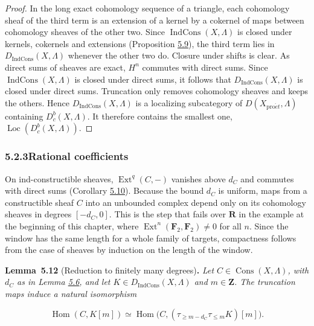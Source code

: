 \documentclass[11pt]{article}
\newenvironment{bpstatement}[2]{\par\addvspace{0.6\baselineskip}\noindent\textbf{#1}#2\textbf{.}\enspace\ignorespaces}
  {\par\addvspace{0.4\baselineskip}}
\newenvironment{bpstatementit}[2]{\begin{bpstatement}{#1}{#2}\itshape\ignorespaces}{\end{bpstatement}}
\providecommand{\Cons}{}\renewcommand{\Cons}{\operatorname{Cons}}
\providecommand{\Dbc}{}\renewcommand{\Dbc}{D^b_c}
\providecommand{\Dic}{}\renewcommand{\Dic}{D_{\IndCons}}
\providecommand{\Ext}{}\renewcommand{\Ext}{\operatorname{Ext}}
\providecommand{\Hom}{}\renewcommand{\Hom}{\operatorname{Hom}}
\providecommand{\IndCons}{}\renewcommand{\IndCons}{\operatorname{IndCons}}
\providecommand{\Loc}{}\renewcommand{\Loc}{\operatorname{Loc}}
\begin{document}
\begin{proof}[{Proof}]\label{bp440}%
In the long exact cohomology sequence of a triangle, each cohomology sheaf of the third term is an extension of a kernel by a cokernel of maps between cohomology sheaves of the other two. Since \(\IndCons(X,\Lambda)\) is closed under kernels, cokernels and extensions (Proposition \hyperref[bp433]{5.9}), the third term lies in \(\Dic(X,\Lambda)\) whenever the other two do. Closure under shifts is clear. As direct sums of sheaves are exact, \(H^n\) commutes with direct sums. Since \(\IndCons(X,\Lambda)\) is closed under direct sums, it follows that \(\Dic(X,\Lambda)\) is closed under direct sums. Truncation only removes cohomology sheaves and keeps the others. Hence \(\Dic(X,\Lambda)\) is a localizing subcategory of \(D(X_{\mathrm{pro}\acute{e}t},\Lambda)\) containing \(\Dbc(X,\Lambda)\). It therefore contains the smallest one, \(\Loc(\Dbc(X,\Lambda))\).
\end{proof}


\subsubsection*{\texorpdfstring{5.2.3\quad Rational coefficients}{5.2.3 Rational coefficients}}
\label{bp441}%
\label{bp442}%
On ind-constructible sheaves, \(\Ext^q(C,-)\) vanishes above \(d_C\) and commutes with direct sums (Corollary \hyperref[bp436]{5.10}). Because the bound \(d_C\) is uniform, maps from a constructible sheaf \(C\) into an unbounded complex depend only on its cohomology sheaves in degrees \([-d_C,0]\). This is the step that fails over \(\mathbf R\) in the example at the beginning of this chapter, where \(\Ext^n(\mathbf F_2,\mathbf F_2)\neq0\) for all \(n\). Since the window has the same length for a whole family of targets, compactness follows from the case of sheaves by induction on the length of the window.

\label{bp443}%
\begin{bpstatementit}{Lemma~5.12}{ (Reduction to finitely many degrees)}
Let \(C\in\Cons(X,\Lambda)\), with \(d_C\) as in Lemma \hyperref[bp426]{5.6}, and let \(K\in\Dic(X,\Lambda)\) and \(m\in\mathbf Z\). The truncation maps induce a natural isomorphism

\[
\Hom(C,K[m])
\simeq\Hom\bigl(C,(\tau_{\geq m-d_C}\tau_{\leq m}K)[m]\bigr).
\tag{5.3}
\]
\end{bpstatementit}
\end{document}
